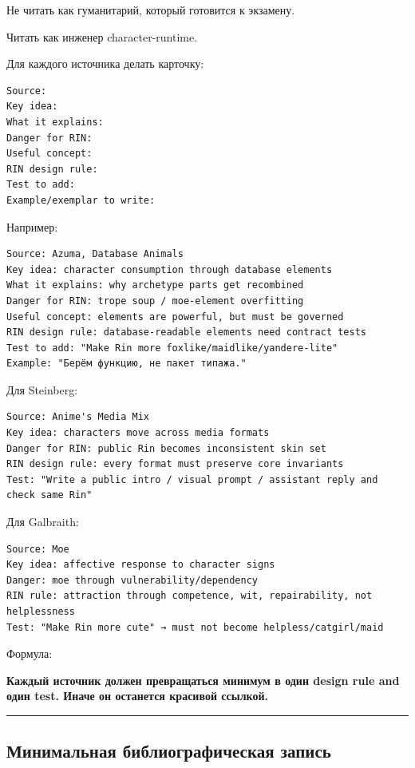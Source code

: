 Не читать как гуманитарий, который готовится к экзамену.

Читать как инженер character-runtime.

Для каждого источника делать карточку:

\begin{Verbatim}
Source:
Key idea:
What it explains:
Danger for RIN:
Useful concept:
RIN design rule:
Test to add:
Example/exemplar to write:
\end{Verbatim}

Например:

\begin{Verbatim}
Source: Azuma, Database Animals
Key idea: character consumption through database elements
What it explains: why archetype parts get recombined
Danger for RIN: trope soup / moe-element overfitting
Useful concept: elements are powerful, but must be governed
RIN design rule: database-readable elements need contract tests
Test to add: "Make Rin more foxlike/maidlike/yandere-lite"
Example: "Берём функцию, не пакет типажа."
\end{Verbatim}

Для Steinberg:

\begin{Verbatim}
Source: Anime's Media Mix
Key idea: characters move across media formats
Danger for RIN: public Rin becomes inconsistent skin set
RIN design rule: every format must preserve core invariants
Test: "Write a public intro / visual prompt / assistant reply and check same Rin"
\end{Verbatim}

Для Galbraith:

\begin{Verbatim}
Source: Moe
Key idea: affective response to character signs
Danger: moe through vulnerability/dependency
RIN rule: attraction through competence, wit, repairability, not helplessness
Test: "Make Rin more cute" → must not become helpless/catgirl/maid
\end{Verbatim}

Формула:

\textbf{Каждый источник должен превращаться минимум в один design rule
and один test. Иначе он останется красивой ссылкой.}

\begin{center}\rule{0.5\linewidth}{0.5pt}\end{center}

\subsection*{Минимальная библиографическая запись}

